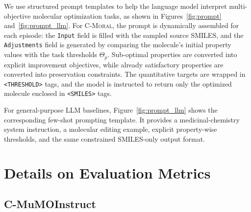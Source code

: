 \documentclass[11pt]{article}
\begin{document}
We use structured prompt templates to help the language model interpret multi-objective molecular optimization tasks, as shown in Figures~\ref{fig:prompt} and~\ref{fig:prompt_llm}. 
For \textsc{C-Moral}, the prompt is dynamically assembled for each episode: the \texttt{Input} field is filled with the sampled source SMILES, and the \texttt{Adjustments} field is generated by comparing the molecule's initial property values with the task thresholds $\Theta_p$. 
Sub-optimal properties are converted into explicit improvement objectives, while already satisfactory properties are converted into preservation constraints. 
The quantitative targets are wrapped in \texttt{<THRESHOLD>} tags, and the model is instructed to return only the optimized molecule enclosed in \texttt{<SMILES>} tags.

For general-purpose LLM baselines, Figure~\ref{fig:prompt_llm} shows the corresponding few-shot prompting template. 
It provides a medicinal-chemistry system instruction, a molecular editing example, explicit property-wise thresholds, and the same constrained SMILES-only output format.



\section{Details on Evaluation Metrics}
\label{appendix:metrics}

\subsection{C-MuMOInstruct}
\label{appendix:c-mumoinstruct}
\end{document}
